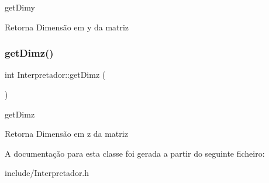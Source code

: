 get\+Dimy 

\begin{DoxyReturn}{Retorna}
Dimensão em y da matriz 
\end{DoxyReturn}
\mbox{\label{class_interpretador_a527bbdc1850ba66ef66d97aecb322576}} 
\subsubsection{\texorpdfstring{get\+Dimz()}{getDimz()}}
{\footnotesize\ttfamily int Interpretador\+::get\+Dimz (\begin{DoxyParamCaption}{ }\end{DoxyParamCaption})}



get\+Dimz 

\begin{DoxyReturn}{Retorna}
Dimensão em z da matriz 
\end{DoxyReturn}


A documentação para esta classe foi gerada a partir do seguinte ficheiro\+:\begin{DoxyCompactItemize}
\item 
include/Interpretador.\+h\end{DoxyCompactItemize}

